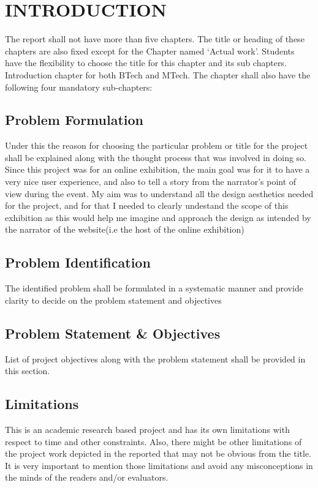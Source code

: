 \chapter{INTRODUCTION} %
\label{ChapterIntroduction} %



The report shall not have more than five chapters. The title or heading of these chapters are also fixed except for the Chapter named ‘Actual work’. Students have the flexibility to choose the title for this chapter and its sub chapters. 
\\
Introduction chapter for both BTech and MTech. The chapter shall also have the following four mandatory sub-chapters: 


\section{Problem Formulation}
Under this the reason for choosing the particular problem or title for the project shall be explained along with the thought process that was involved in doing so.
Since this project was for an online exhibition, the main goal was for it to have a very nice user experience, and also to tell a story from the narrator's point of view during the event.
My aim was to understand all the design aesthetics needed for the project, and for that I needed to clearly undestand the scope of this exhibition as this would help me imagine and approach the design as intended by the narrator of the website(i.e the host of the online exhibition)

\section{Problem Identification}
The identified problem shall be formulated in a systematic manner and provide clarity to decide on the problem statement and objectives


\section{Problem Statement \& Objectives}
List of project objectives along with the problem statement shall be provided in this section.


\section{Limitations}
This is an academic research based project and has its own limitations with respect to time and other constraints. Also, there might be other limitations of the project work depicted in the reported that may not be obvious from the title. It is very important to mention those limitations and avoid any misconceptions in the minds of the readers and/or evaluators.

